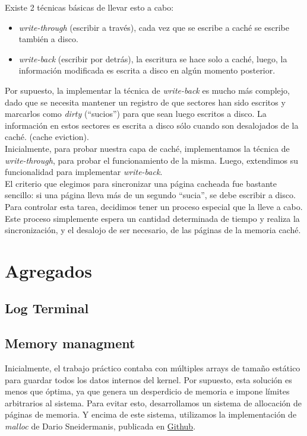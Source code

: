 \documentclass[a4paper,10pt]{article}
\begin{document}
Existe 2 técnicas básicas de llevar esto a cabo:

\begin{itemize}
  \item \textit{write-through} (escribir a través), cada vez que se escribe a caché se escribe también a disco.
  \item \textit{write-back} (escribir por detrás), la escritura se hace solo a caché, luego, la información modificada es escrita a disco en algún momento posterior.
\end{itemize}

Por supuesto, la implementar la técnica de \textit{write-back} es mucho más complejo, dado que se necesita mantener un registro de que sectores han sido escritos y 
marcarlos como \textit{dirty} (``sucios'') para que sean luego escritos a disco. La información en estos sectores es escrita a disco sólo cuando son desalojados
de la caché. (cache eviction). \\

Inicialmente, para probar nuestra capa de caché, implementamos la técnica de \textit{write-through}, para probar el funcionamiento de la misma. 
Luego, extendimos su funcionalidad para implementar \textit{write-back}. \\

El criterio que elegimos para sincronizar una página cacheada fue bastante sencillo: si una página lleva más de un segundo ``sucia'', se debe escribir a disco.
Para controlar esta tarea, decidimos tener un proceso especial que la lleve a cabo. Este proceso simplemente espera un cantidad determinada de tiempo y realiza 
la sincronización, y el desalojo de ser necesario, de las páginas de la memoria caché.


\newpage
\section{Agregados}

\subsection{Log Terminal}

\subsection{Memory managment}
Inicialmente, el trabajo práctico contaba con múltiples arrays de tamaño estático para guardar todos los datos internos del kernel.
Por supuesto, esta solución es menos que óptima, ya que genera un desperdicio de memoria e impone límites arbitrarios al sistema.
Para evitar esto, desarrollamos un sistema de allocación de páginas de memoria.
Y encima de este sistema, utilizamos la implementación de \textit{malloc} de Dario Sneidermanis, publicada en \href{https://github.com/esneider/malloc}{Github}.
\end{document}
